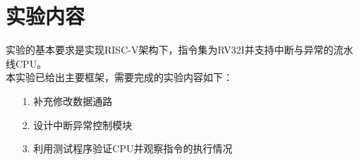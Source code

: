 
\section{实验内容}
实验的基本要求是实现RISC-V架构下，指令集为RV32I并支持中断与异常的流水线CPU。 \\
本实验已给出主要框架，需要完成的实验内容如下：
\begin{itemize}
    \item [1.] 补充修改数据通路
    \item [2.] 设计中断异常控制模块
    \item [3.] 利用测试程序验证CPU并观察指令的执行情况
\end{itemize}  